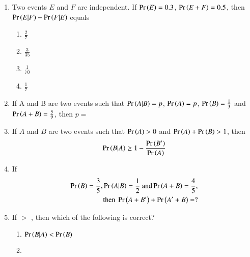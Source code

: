 \begin{enumerate}[label=\thesubsection.\arabic*,ref=\thesubsection.\theenumi,resume*]
\begin{multicols}{4}
\begin{enumerate}
\item $1-\pr{A|B}$
\item $1-\pr{A^\prime|B}$
\item $\frac{1-\pr{A+B}}{\pr{B^\prime}}$
\item $\frac{\pr{A^\prime}}{\pr{B^\prime}}$
\end{enumerate}
\end{multicols}
\solution

\item  Two events $E$ and $F$ are independent. If $\Pr\left(E\right) = 0.3$, $\Pr\left(E+F\right) = 0.5$, then $\Pr\left(E|F\right)-\Pr\left(F|E\right)$ equals
\begin{multicols}{4}
\begin{enumerate}
    \item $\frac{2}{7}$
    \item $\frac{3}{35}$
    \item $\frac{1}{70}$
    \item $\frac{1}{7}$
\end{enumerate}
\end{multicols}
\solution

\item If A and B are two events such that $\Pr\left(A|B\right)=p$, $\Pr\left(A\right)=p$, $\Pr\left(B\right)=\frac{1}{3}$ and $\Pr\left(A+B\right)=\frac{5}{9}$, then $p=$\\
\solution

\item If $A$ and $B$ are two events such that $\Pr\left(A\right) > 0$ and $\Pr\left(A\right) + \Pr\left(B\right) > 1$, then 
\begin{align}
    \pr{B | A} \geq 1 - \frac{\pr{B^\prime}}{\pr{A}}
	\label{eq:12/13/3/102/final}
\end{align}
\solution

\item If 
\begin{align}
\Pr\left(B\right) = \frac{3}{5},
\Pr\left(A|B\right) = \frac{1}{2} \text{ and}
\Pr\left(A + B\right) = \frac{4}{5}, 
\\
\text{then }
\Pr\left(A + B^{\prime}\right) + \Pr\left(A^{\prime} + B\right) =?
\end{align}
\solution

\item
 If  $>$ , then which of the following is correct? 
\begin{multicols}{2}
\begin{enumerate}
 \item  
 \label{12.13.6.18.A}
$ \Pr\left(B|A\right) < \Pr\left(B\right)$
 \item 

\end{enumerate}
\end{multicols}
\end{enumerate}
